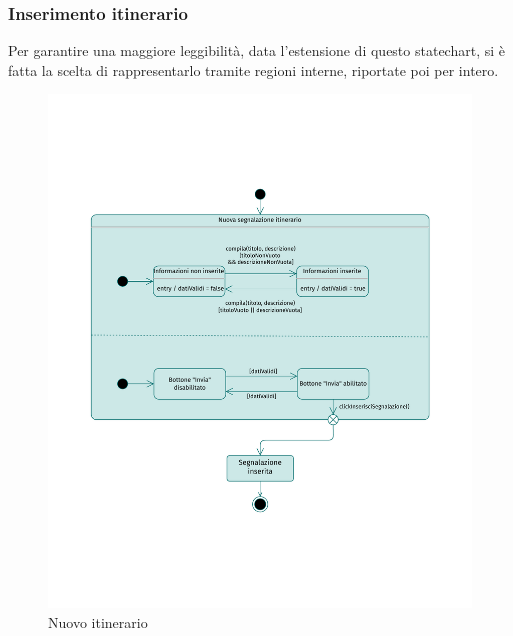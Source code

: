 \documentclass{natourDoc}
\begin{document}
\subsubsection{Inserimento itinerario}
Per garantire una maggiore leggibilità, data l'estensione di questo statechart, 
si è fatta la scelta di rappresentarlo tramite regioni interne, riportate poi per intero.
\begin{figure}[!htbp]
	\centering
	\includegraphics[width=\textwidth, page=2]{./diagrams/statechart.pdf}
	\caption{Nuovo itinerario}
\end{figure}
\FloatBarrier
\end{document}
